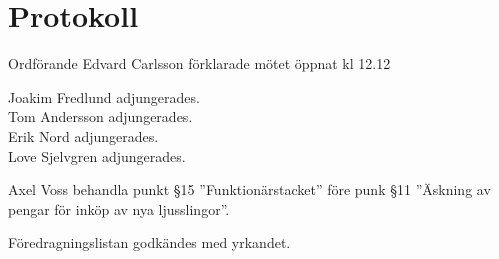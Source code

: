 \documentclass[10pt]{article}
\def\mo{Edvard Carlsson}
\begin{document}
\section*{Protokoll}
\begin{paragrafer}
Ordförande {\mo} förklarade mötet öppnat kl 12.12

{\valavmo}

{\valavms}

{\valavj}

{\tosg}

Joakim Fredlund adjungerades.\\
Tom Andersson adjungerades.\\
Erik Nord adjungerades.\\
Love Sjelvgren adjungerades. 






Axel Voss \ypa behandla punkt \S15 ''Funktionärstacket'' före punk \S11 ''Äskning av pengar för inköp av nya ljusslingor''.

Föredragningslistan godkändes med yrkandet.

\textit{\ingaprot}

\begin{fyllnadsval} %


\end{fyllnadsval}
\end{paragrafer}
\end{document}
